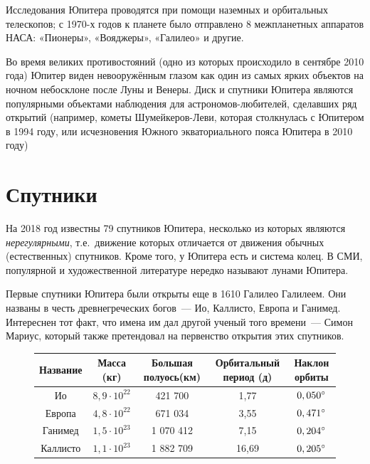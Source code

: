 \documentclass{article}
\begin{document}
	Исследования Юпитера проводятся при помощи наземных и орбитальных телескопов; с 1970-х годов к
	планете было отправлено 8 межпланетных аппаратов НАСА: «Пионеры», «Вояджеры», «Галилео» и другие.

	Во время великих противостояний (одно из которых происходило в сентябре 2010 года) Юпитер
	виден невооружённым глазом как один из самых ярких объектов на ночном небосклоне после Луны и
	Венеры. Диск и спутники Юпитера являются популярными объектами наблюдения для астрономов-любителей,
	сделавших ряд открытий (например, кометы Шумейкеров-Леви, которая столкнулась с Юпитером в 1994 
	году, или исчезновения Южного экваториального пояса Юпитера в 2010 году)
	\section{Спутники}	
	На 2018 год известны 79 спутников Юпитера, несколько из которых являются \textit{нерегулярными}, 
	т.е.~движение которых отличается от движения обычных (естественных) спутников. Кроме того, у Юпитера
	есть и система колец. В СМИ, популярной и художественной литературе нередко называют лунами Юпитера.
	
	Первые спутники Юпитера были открыты еще в 1610 Галилео Галилеем. Они названы в честь древнегреческих
	богов~--- Ио, Каллисто, Европа и Ганимед. Интереснен тот факт, что имена им дал другой ученый того
	времени~--- Симон Мариус, который также претендовал на первенство открытия этих спутников.
	\begin{figure}[h!]
	\begin{tabularx}{\textwidth}{|C|C|C|C|C|}
		\hline
		Название & Масса (кг) & Большая полуось(км) & Орбитальный период (д) & Наклон орбиты\\		
		\hline
		Ио & $8,9\cdot 10^{22}$ & 421 700 & 1,77 & $0,050\degree$\\
		\hline
		Европа & $4,8\cdot10^{22}$ & 671 034 & 3,55 & $0,471\degree$\\
		\hline
		Ганимед & $1,5\cdot10^{23}$ & 1 070 412 & 7,15 & $0,204\degree$\\
		\hline
		Каллисто & $1,1\cdot10^{23}$ & 1 882 709 & 16,69 & $0,205\degree$\\
		\hline
	\end{tabularx}
	\end{figure}
\end{document}

